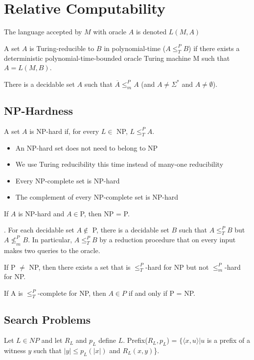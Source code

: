 \section{Relative Computability}

 The language accepted by $M$ with oracle $A$ is denoted $L(M, A)$

 A set $A$ is Turing-reducible to $B$ in polynomial-time 
($A \le_T^P B$) if there exists a deterministic polynomial-time-bounded oracle 
Turing machine M such that $A = L(M, B)$.

 There is a decidable set $A$ such that $\overline{A} \le_m^P A$ (and
$A \ne \Sigma^*$ and $A \ne \emptyset$).

\subsection{NP-Hardness}

 A set $A$ is NP-hard if, for every $L \in$ NP,
$L \le^P_T A$.
\begin{itemize}
  \item An NP-hard set does not need to belong to NP
  \item We use Turing reducibility this time instead of many-one reducibility
  \item Every NP-complete set is NP-hard
  \item The complement of every NP-complete set is NP-hard
\end{itemize}

 If $A$ is NP-hard and $A \in $P, then NP = P.

. For each decidable set $A \notin $ P, there is a
decidable set $B$ such that $A \le^P_T B$ but $A \nleq^P_m B$. In particular, 
$A \le^P_T B$ by a reduction procedure that on every input makes two queries to the oracle.

 If P $\ne$ NP, then there exists a set that is $\le^P_T$-hard 
for NP but not $\le^P_m$-hard for NP.

 If A is $\le^P_T$-complete for NP, then $A \in P$ if and only if P = NP.

\subsection{Search Problems}

 Let $L \in NP$ and let $R_L$ and $p_L$ define $L$.
Prefix($R_L, p_L$) = $\{\langle x, u \rangle | u$ is a prefix of a witness $y$ such that
$|y| \le p_L(|x|)$ and $R_L(x, y)$\}.

